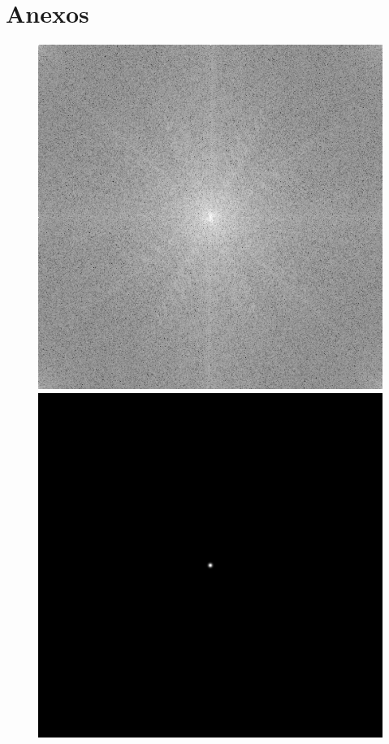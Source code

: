 \documentclass[twoside,twocolumn]{article}
\begin{document}

\section*{Anexos}

\begin{figure}[H]
\begin{center}
	\includegraphics[scale=.19]{figures/butterfly_mag_spec_2.png}
	\includegraphics[scale=.19]{figures/butterfly_gau_filter_2.png}

\end{center}
\end{figure}
\end{document}
